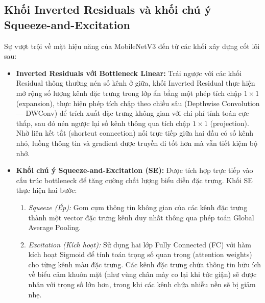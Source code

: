 \documentclass[../DoAn.tex]{subfiles}
\begin{document}
\subsection{Khối Inverted Residuals và khối chú ý Squeeze-and-Excitation}
Sự vượt trội về mặt hiệu năng của MobileNetV3 đến từ các khối xây dựng cốt lõi sau:
\begin{itemize}
    \item \textbf{Inverted Residuals với Bottleneck Linear:} Trái ngược với các khối Residual thông thường nén số kênh ở giữa, khối Inverted Residual thực hiện mở rộng số lượng kênh đặc trưng trong lớp ẩn bằng một phép tích chập $1 \times 1$ (expansion), thực hiện phép tích chập theo chiều sâu (Depthwise Convolution --- DWConv) để trích xuất đặc trưng không gian với chi phí tính toán cực thấp, sau đó nén ngược lại số kênh thông qua tích chập $1 \times 1$ (projection). Nhờ liên kết tắt (shortcut connection) nối trực tiếp giữa hai đầu có số kênh nhỏ, luồng thông tin và gradient được truyền đi tốt hơn mà vẫn tiết kiệm bộ nhớ.
    \item \textbf{Khối chú ý Squeeze-and-Excitation (SE):} Được tích hợp trực tiếp vào cấu trúc bottleneck để tăng cường chất lượng biểu diễn đặc trưng. Khối SE thực hiện hai bước:
    \begin{enumerate}
        \item \textit{Squeeze (Ép):} Gom cụm thông tin không gian của các kênh đặc trưng thành một vector đặc trưng kênh duy nhất thông qua phép toán Global Average Pooling.
        \item \textit{Excitation (Kích hoạt):} Sử dụng hai lớp Fully Connected (FC) với hàm kích hoạt Sigmoid để tính toán trọng số quan trọng (attention weights) cho từng kênh màu đặc trưng. Các kênh đặc trưng chứa thông tin hữu ích về biểu cảm khuôn mặt (như vùng chân mày co lại khi tức giận) sẽ được nhân với trọng số lớn hơn, trong khi các kênh chứa nhiễu nền sẽ bị giảm nhẹ.
    \end{enumerate}
\end{itemize}
\end{document}
